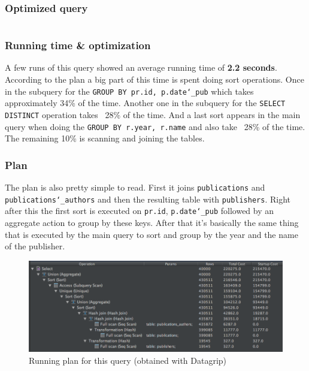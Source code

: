 \documentclass[doubleside, titlepage]{article}
\begin{document}
\subsubsection{Optimized query}
		\begin{lstlisting}[language=SQL,showspaces=false,basicstyle=\ttfamily,numberstyle=\tiny,commentstyle=\color{gray}]

		\end{lstlisting}
		
\subsubsection{Running time \& optimization}

A few runs of this query showed an average running time of \textbf{2.2 seconds}. According to the plan a big part of this time is spent doing sort operations. Once in the subquery for the \texttt{GROUP BY pr.id, p.date\char`_pub} which takes approximately 34\% of the time. Another one in the subquery for the \texttt{SELECT DISTINCT} operation takes ~28\% of the time. And a last sort appears in the main query when doing the \texttt{GROUP BY r.year, r.name} and also take ~28\% of the time. The remaining 10\% is scanning and joining the tables.

\subsubsection{Plan}
The plan is also pretty simple to read. First it joins \texttt{publications} and \texttt{publications\char`_authors} and then the resulting table with \texttt{publishers}. Right after this the first sort is executed on \texttt{pr.id}, \texttt{p.date\char`_pub} followed by an aggregate action to group by these keys. After that it's basically the same thing that is executed by the main query to sort and group by the year and the name of the publisher.

\begin{figure}[!htb]
	\centering
    \includegraphics[scale = 0.5]{./query_analysis/query16}
    \caption{Running plan for this query (obtained with Datagrip)}
\end{figure}
\end{document}
